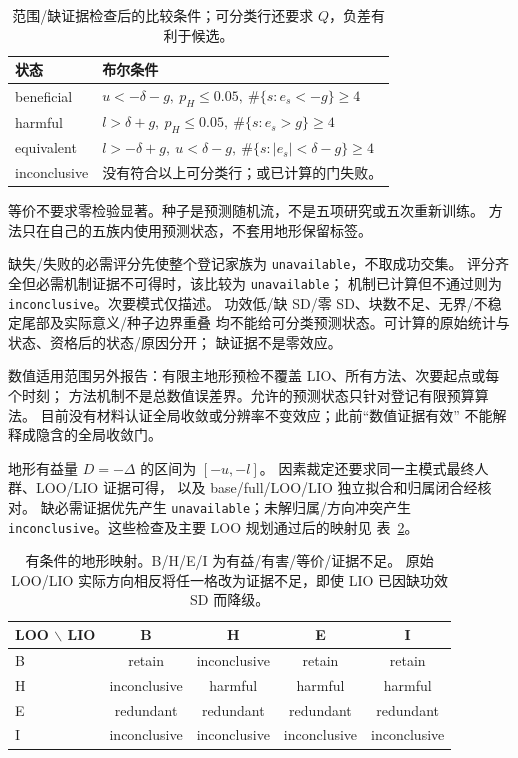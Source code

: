 \begin{table}[htbp]
\centering\small
\caption{范围/缺证据检查后的比较条件；可分类行还要求 \(Q\)，负差有利于候选。}
\label{tab:comparison-conditions}\hypertarget{tab:comparison-conditions}{}
\begin{tabular}{lp{4.8in}}
\toprule
状态 & 布尔条件\\
\midrule
beneficial & \(u<-\delta-g,\ p_H\leq0.05,\ \#\{s:e_s<-g\}\geq4\)\\
harmful & \(l>\delta+g,\ p_H\leq0.05,\ \#\{s:e_s>g\}\geq4\)\\
equivalent & \(l>-\delta+g,\ u<\delta-g,\ \#\{s:|e_s|<\delta-g\}\geq4\)\\
inconclusive & 没有符合以上可分类行；或已计算的门失败。\\
\bottomrule
\end{tabular}
\end{table}

等价不要求零检验显著。种子是预测随机流，不是五项研究或五次重新训练。
方法只在自己的五族内使用预测状态，不套用地形保留标签。

缺失/失败的必需评分先使整个登记家族为 \texttt{unavailable}，不取成功交集。
评分齐全但必需机制证据不可得时，该比较为 \texttt{unavailable}；
机制已计算但不通过则为 \texttt{inconclusive}。次要模式仅描述。
功效低/缺 SD/零 SD、块数不足、无界/不稳定尾部及实际意义/种子边界重叠
均不能给可分类预测状态。可计算的原始统计与状态、资格后的状态/原因分开；
缺证据不是零效应。

数值适用范围另外报告：有限主地形预检不覆盖 LIO、所有方法、次要起点或每个时刻；
方法机制不是总数值误差界。允许的预测状态只针对登记有限预算算法。
目前没有材料认证全局收敛或分辨率不变效应；此前“数值证据有效”
不能解释成隐含的全局收敛门。

地形有益量 \(D=-\Delta\) 的区间为 \([-u,-l]\)。
因素裁定还要求同一主模式最终人群、LOO/LIO 证据可得，
以及 base/full/LOO/LIO 独立拟合和归属闭合经核对。
缺必需证据优先产生 \texttt{unavailable}；未解归属/方向冲突产生
\texttt{inconclusive}。这些检查及主要 LOO 规划通过后的映射见
表~\ref{tab:loo-lio-states}。

\begin{table}[htbp]
\centering\small
\caption{有条件的地形映射。B/H/E/I 为有益/有害/等价/证据不足。
原始 LOO/LIO 实际方向相反将任一格改为证据不足，即使 LIO 已因缺功效 SD 而降级。}
\label{tab:loo-lio-states}\hypertarget{tab:loo-lio-states}{}
\begin{tabular}{lcccc}
\toprule
LOO \(\backslash\) LIO & B & H & E & I\\
\midrule
B & retain & inconclusive & retain & retain\\
H & inconclusive & harmful & harmful & harmful\\
E & redundant & redundant & redundant & redundant\\
I & inconclusive & inconclusive & inconclusive & inconclusive\\
\bottomrule
\end{tabular}
\end{table}

